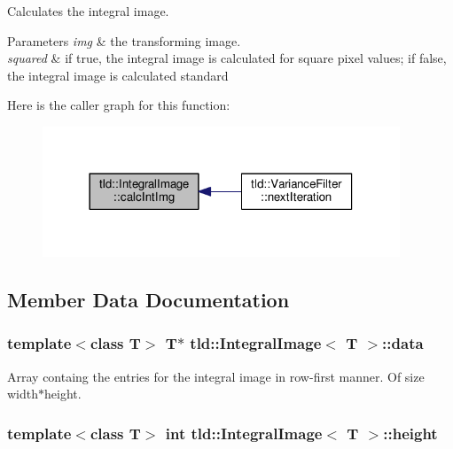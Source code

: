 Calculates the integral image. 


\begin{DoxyParams}{Parameters}
{\em img} & the transforming image. \\
\hline
{\em squared} & if true, the integral image is calculated for square pixel values; if false, the integral image is calculated standard \\
\hline
\end{DoxyParams}


Here is the caller graph for this function\-:\nopagebreak
\begin{figure}[H]
\begin{center}
\leavevmode
\includegraphics[width=302pt]{classtld_1_1IntegralImage_a85bb20526a40615c3d0d7c0b5e53b55a_icgraph}
\end{center}
\end{figure}




\subsection{Member Data Documentation}
\hypertarget{classtld_1_1IntegralImage_a671be18d2f3a30aa1aea12d63a787e48}{
\subsubsection[{data}]{\setlength{\rightskip}{0pt plus 5cm}template$<$class T$>$ T$\ast$ {\bf tld\-::\-Integral\-Image}$<$ T $>$\-::data}}\label{classtld_1_1IntegralImage_a671be18d2f3a30aa1aea12d63a787e48}


Array containg the entries for the integral image in row-\/first manner. Of size width$\ast$height. 

\hypertarget{classtld_1_1IntegralImage_ad5f65eee66dc3ba0d8f0462f858c1e99}{
\subsubsection[{height}]{\setlength{\rightskip}{0pt plus 5cm}template$<$class T$>$ int {\bf tld\-::\-Integral\-Image}$<$ T $>$\-::height}}\label{classtld_1_1IntegralImage_ad5f65eee66dc3ba0d8f0462f858c1e99}


